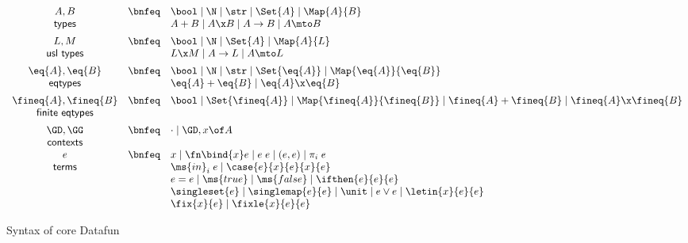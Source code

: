 \documentclass[preprint]{sigplanconf}
\renewcommand{\pipe}{\mathrel{\mid}} %
\newcommand{\uto}{\to}
\begin{document}

\begin{figure}
  \[\begin{array}{ccl}
    A, B     &\bnfeq& \bool \pipe \N \pipe \str \pipe \Set{A}
                      \pipe \Map{A}{B}
    \\
    \textsf{types} && A + B \pipe A \x B \pipe A \uto B \pipe A \mto B
    \vspace{0.5em}\\
    L, M         &\bnfeq& \bool \pipe \N \pipe \Set{A} \pipe \Map{A}{L}
    \\
    \textsf{usl types} && L \x M \pipe A \uto L \pipe A \mto L
    \vspace{0.5em}\\
    \eq{A}, \eq{B} &\bnfeq& \bool \pipe \N \pipe \str \pipe \Set{\eq{A}}
                            \pipe \Map{\eq{A}}{\eq{B}}
    \\
    \textsf{eqtypes} && \eq{A} + \eq{B} \pipe \eq{A} \x \eq{B}
    \vspace{0.5em}\\
    \fineq{A},\fineq{B}
    &\bnfeq& \bool \pipe \Set{\fineq{A}}
       \pipe \Map{\fineq{A}}{\fineq{B}}
       \pipe \fineq{A} + \fineq{B} \pipe \fineq{A} \x \fineq{B}\\
    \textsf{finite eqtypes}
    \vspace{0.5em}\\
    \GD, \GG &\bnfeq& \cdot \pipe \GD, x\of A\\
    \textsf{contexts}\\
    e &\bnfeq& x \pipe \fn\bind{x} e \pipe e\;e \pipe (e,e) \pipe \pi_i\;e\\
    \textsf{terms} && \ms{in}_i\; e \pipe \case{e}{x}{e}{x}{e}\\
    && e = e \pipe \ms{true} \pipe \ms{false} \pipe \ifthen{e}{e}{e}\\
    && \singleset{e} \pipe \singlemap{e}{e}
       \pipe \unit \pipe e \vee e \pipe \letin{x}{e}{e}\\
    && \fix{x}{e} \pipe \fixle{x}{e}{e}
  \end{array}\]
  \caption{Syntax of core Datafun}
\end{figure}
\end{document}
